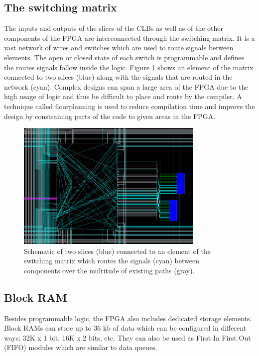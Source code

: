     \subsection{The switching matrix}

      The inputs and outputs of the slices of the CLBs as well as of the other components of the FPGA are interconnected through the switching matrix. It is a vast network of wires and switches which are used to route signals between elements. The open or closed state of each switch is programmable and defines the routes signals follow inside the logic. Figure \ref{fig:II-6-switch} shows an element of the matrix connected to two slices (blue) along with the signals that are routed in the network (cyan). Complex designs can span a large area of the FPGA due to the high usage of logic and thus be difficult to place and route by the compiler. A technique called floorplanning is used to reduce compilation time and improve the design by constraining parts of the code to given areas in the FPGA.

      \begin{figure}[h!]
        \centering
        \includegraphics[width=0.8\textwidth]{img/II-6-irradiation/switch.png}
        \caption{Schematic of two slices (blue) connected to an element of the switching matrix which routes the signals (cyan) between components over the multitude of existing paths (gray).}
        \label{fig:II-6-switch}
      \end{figure}

    \subsection{Block RAM}

      Besides programmable logic, the FPGA also includes dedicated storage elements. Block RAMs \cite{VIRTEX-RAM} can store up to 36 kb of data which can be configured in different ways: 32K x 1 bit, 16K x 2 bits, etc. They can also be used as First In First Out (FIFO) modules which are similar to data queues.

